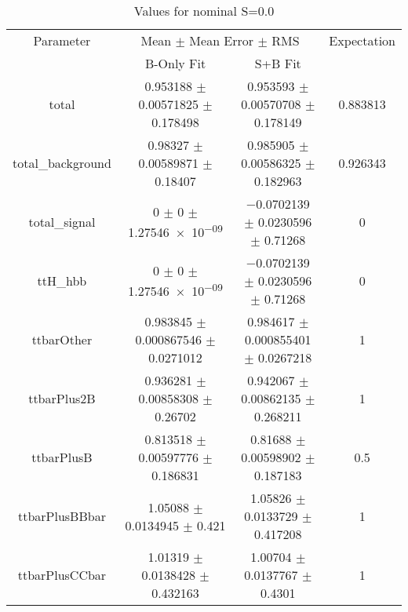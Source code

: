 \begin{table}
\centering
\caption{Values for nominal S=0.0}
\begin{tabular}{cccc}
\toprule
Parameter & \multicolumn{2}{c}{Mean $\pm$ Mean Error $\pm$ RMS} & Expectation\\
 & B-Only Fit & S+B Fit & \\
\midrule
total & \num{0.953188} $\pm$ \num{0.00571825} $\pm$ \num{0.178498} & \num{0.953593} $\pm$ \num{0.00570708} $\pm$ \num{0.178149} & \num{0.883813}\\
total\_background & \num{0.98327} $\pm$ \num{0.00589871} $\pm$ \num{0.18407} & \num{0.985905} $\pm$ \num{0.00586325} $\pm$ \num{0.182963} & \num{0.926343}\\
total\_signal & \num{0} $\pm$ \num{0} $\pm$ \num{1.27546e-09} & \num{-0.0702139} $\pm$ \num{0.0230596} $\pm$ \num{0.71268} & \num{0}\\
ttH\_hbb & \num{0} $\pm$ \num{0} $\pm$ \num{1.27546e-09} & \num{-0.0702139} $\pm$ \num{0.0230596} $\pm$ \num{0.71268} & \num{0}\\
ttbarOther & \num{0.983845} $\pm$ \num{0.000867546} $\pm$ \num{0.0271012} & \num{0.984617} $\pm$ \num{0.000855401} $\pm$ \num{0.0267218} & \num{1}\\
ttbarPlus2B & \num{0.936281} $\pm$ \num{0.00858308} $\pm$ \num{0.26702} & \num{0.942067} $\pm$ \num{0.00862135} $\pm$ \num{0.268211} & \num{1}\\
ttbarPlusB & \num{0.813518} $\pm$ \num{0.00597776} $\pm$ \num{0.186831} & \num{0.81688} $\pm$ \num{0.00598902} $\pm$ \num{0.187183} & \num{0.5}\\
ttbarPlusBBbar & \num{1.05088} $\pm$ \num{0.0134945} $\pm$ \num{0.421} & \num{1.05826} $\pm$ \num{0.0133729} $\pm$ \num{0.417208} & \num{1}\\
ttbarPlusCCbar & \num{1.01319} $\pm$ \num{0.0138428} $\pm$ \num{0.432163} & \num{1.00704} $\pm$ \num{0.0137767} $\pm$ \num{0.4301} & \num{1}\\
\bottomrule
\end{tabular}
\end{table}